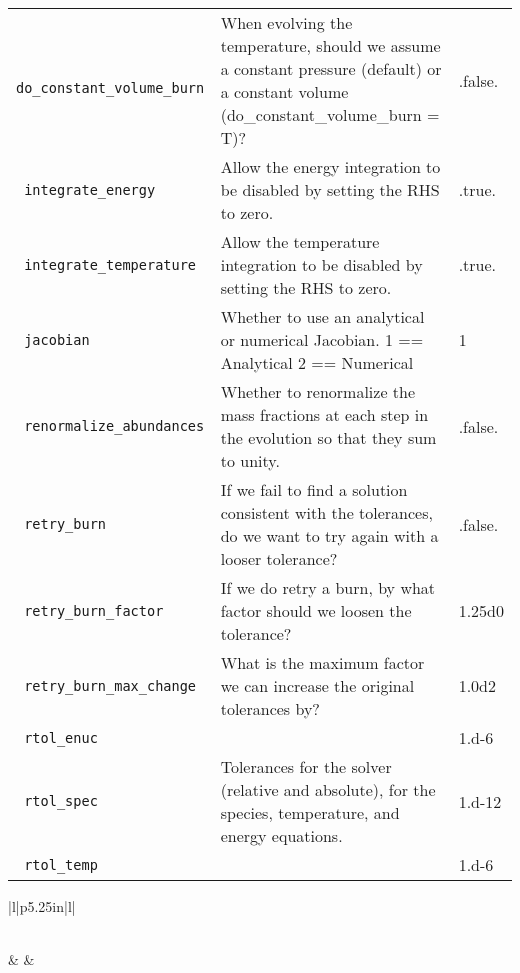 \begin{landscape}
{\begin{center}
\begin{longtable}{|l|p{5.25in}|l|}
\verb= do_constant_volume_burn = &  When evolving the temperature, should we assume a constant pressure (default) or a constant volume (do\_constant\_volume\_burn = T)? & .false. \\
\rowcolor{tableShade}
\verb= integrate_energy = &  Allow the energy integration to be disabled by setting the RHS to zero. & .true. \\
\verb= integrate_temperature = &  Allow the temperature integration to be disabled by setting the RHS to zero. & .true. \\
\rowcolor{tableShade}
\verb= jacobian = &  Whether to use an analytical or numerical Jacobian. 1 == Analytical 2 == Numerical & 1 \\
\verb= renormalize_abundances = &  Whether to renormalize the mass fractions at each step in the evolution so that they sum to unity. & .false. \\
\rowcolor{tableShade}
\verb= retry_burn = &  If we fail to find a solution consistent with the tolerances, do we want to try again with a looser tolerance? & .false. \\
\verb= retry_burn_factor = &  If we do retry a burn, by what factor should we loosen the tolerance? & 1.25d0 \\
\rowcolor{tableShade}
\verb= retry_burn_max_change = &  What is the maximum factor we can increase the original tolerances by? & 1.0d2 \\
\verb= rtol_enuc = &  & 1.d-6 \\
\rowcolor{tableShade}
\verb= rtol_spec = &  Tolerances for the solver (relative and absolute), for the species, temperature, and energy equations. & 1.d-12 \\
\verb= rtol_temp = &  & 1.d-6 \\


\end{longtable}
\end{center}

} %


{\small

\renewcommand{\arraystretch}{1.5}
%
\begin{center}
\begin{longtable}{|l|p{5.25in}|l|}
\caption[kpp parameters.]{kpp parameters.} \label{table: kpp runtime} \\
%
\hline {} &
        &
        \\ \hline
\endfirsthead


\end{longtable}
\end{center}}
\end{landscape}
